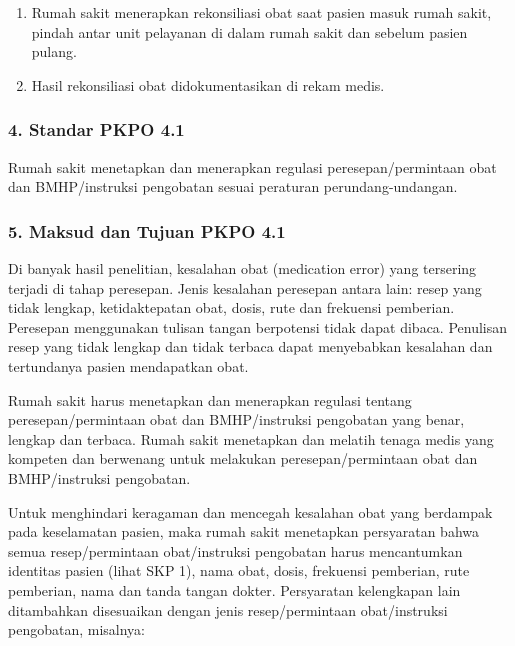\documentclass[
]{book}
\providecommand{\tightlist}{%
  \setlength{\itemsep}{0pt}\setlength{\parskip}{0pt}}
\begin{document}
\begin{enumerate}
\def\labelenumi{\alph{enumi}.}
\tightlist
\item
  Rumah sakit menerapkan rekonsiliasi obat saat pasien masuk rumah sakit, pindah antar unit pelayanan di dalam rumah sakit dan sebelum pasien pulang.
\item
  Hasil rekonsiliasi obat didokumentasikan di rekam medis.
\end{enumerate}

\hypertarget{standar-pkpo-4.1}{%
\subsubsection*{4. Standar PKPO 4.1}\label{standar-pkpo-4.1}}

Rumah sakit menetapkan dan menerapkan regulasi peresepan/permintaan obat dan BMHP/instruksi pengobatan sesuai peraturan perundang-undangan.

\hypertarget{maksud-dan-tujuan-pkpo-4.1}{%
\subsubsection*{5. Maksud dan Tujuan PKPO 4.1}\label{maksud-dan-tujuan-pkpo-4.1}}

Di banyak hasil penelitian, kesalahan obat (medication error) yang tersering terjadi di tahap peresepan. Jenis kesalahan peresepan antara lain: resep yang tidak lengkap, ketidaktepatan obat, dosis, rute dan frekuensi pemberian. Peresepan menggunakan tulisan tangan berpotensi tidak dapat dibaca. Penulisan resep yang tidak lengkap dan tidak terbaca dapat menyebabkan kesalahan dan tertundanya pasien mendapatkan obat.

Rumah sakit harus menetapkan dan menerapkan regulasi tentang peresepan/permintaan obat dan BMHP/instruksi pengobatan yang benar, lengkap dan terbaca. Rumah sakit menetapkan dan melatih tenaga medis yang kompeten dan berwenang untuk melakukan peresepan/permintaan obat dan BMHP/instruksi pengobatan.

Untuk menghindari keragaman dan mencegah kesalahan obat yang berdampak pada keselamatan pasien, maka rumah sakit menetapkan persyaratan bahwa semua resep/permintaan obat/instruksi pengobatan harus mencantumkan identitas pasien (lihat SKP 1), nama obat, dosis, frekuensi pemberian, rute pemberian, nama dan tanda tangan dokter. Persyaratan kelengkapan lain ditambahkan disesuaikan dengan jenis resep/permintaan obat/instruksi pengobatan, misalnya:
\end{document}
